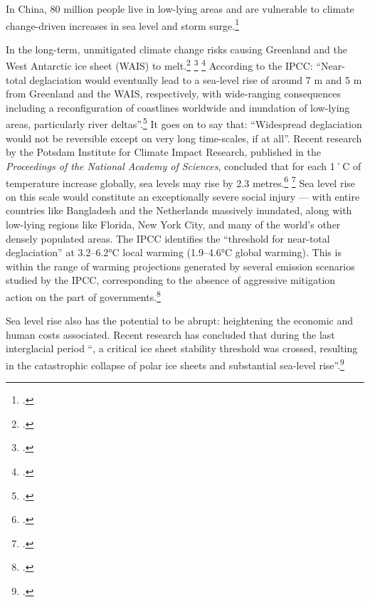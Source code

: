 In China, 80 million people live in low-lying areas and are vulnerable to climate change-driven increases in sea level and storm surge.\footcite[][p. 19]{EastGrey2013}



In the long-term, unmitigated climate change risks causing Greenland and the West Antarctic ice sheet (WAIS) to melt.\footcite[See: ][]{Goelzer2013} \footcite[][]{GreenlandContribution2013} \footcite[][]{Nghiem2012}
According to the IPCC: ``Near-total deglaciation would eventually lead to a sea-level rise of around 7 m and 5 m from Greenland and the WAIS, respectively, with wide-ranging consequences including a reconfiguration of coastlines worldwide and inundation of low-lying areas, particularly river deltas''.\footcite[][See: "Deglaciation of West Antarctic and Greenland ice sheets" \url{https://www.ipcc.ch/publications_and_data/ar4/wg2/en/ch19s19-3-5-2.html}]{IPCC2007}
It goes on to say that: ``Widespread deglaciation would not be reversible except on very long time-scales, if at all''.
Recent research by the Potsdam Institute for Climate Impact Research, published in the \emph{Proceedings of the National Academy of Sciences}, concluded that for each 1˚C of temperature increase globally, sea levels may rise by 2.3 metres.\footcite[][]{PotsdamSeaLevelReport} \footcite[See also: ][]{TwoPointThreeMetres}
Sea level rise on this scale would constitute an exceptionally severe social injury --- with entire countries like Bangladesh and the Netherlands massively inundated, along with low-lying regions like Florida, New York City, and many of the world's other densely populated areas.
The IPCC identifies the ``threshold for near-total deglaciation'' at 3.2--6.2°C local warming (1.9--4.6°C global warming).
This is within the range of warming projections generated by several emission scenarios studied by the IPCC, corresponding to the absence of aggressive mitigation action on the part of governments.\footcite[][See: "Projected climate change an its impacts" \url{https://www.ipcc.ch/publications_and_data/ar4/syr/en/spms3.html}"]{IPCC2007}



Sea level rise also has the potential to be abrupt: heightening the economic and human costs associated.
Recent research has concluded that during the last interglacial period ``, a critical ice sheet stability threshold was crossed, resulting in the catastrophic collapse of polar ice sheets and substantial sea-level rise''.\footcite[][p. 1]{OLeary2013}


